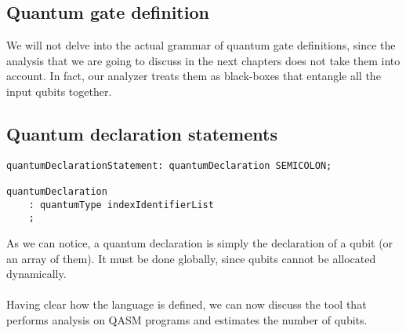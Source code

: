 \documentclass[12pt,a4paper]{report}
\theoremstyle{definition}
\theoremstyle{definition}
\theoremstyle{definition}
\begin{document}
\subsection{Quantum gate definition}
We will not delve into the actual grammar of quantum gate definitions, since the analysis that we are going to discuss in the next chapters does not take them into account. In fact, our analyzer treats them as black-boxes that entangle all the input qubits together.


\subsection{Quantum declaration statements}
\begin{lstlisting}
quantumDeclarationStatement: quantumDeclaration SEMICOLON;

quantumDeclaration
    : quantumType indexIdentifierList
    ;
\end{lstlisting}
As we can notice, a quantum declaration is simply the declaration of a qubit (or an array of them). It must be done globally, since qubits cannot be allocated dynamically.\\\\
Having clear how the language is defined, we can now discuss the tool that performs analysis on QASM programs and estimates the number of qubits.
\end{document}
